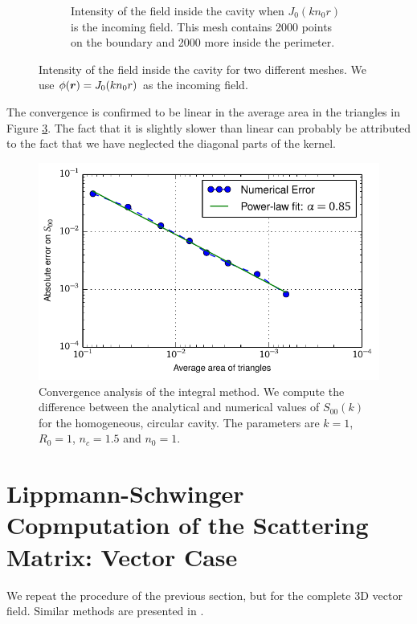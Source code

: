 \begin{figure}
\begin{subfigure}{0.47\textwidth}
		\caption[Intensity of the field inside the cavity, finer mesh]
				{Intensity of the field inside the cavity when
				$J_0(kn_0r)$ is the incoming field. This mesh contains
				2000 points on the boundary and 2000 more inside the perimeter.}
		\label{fig:app.numMethods.field.2000}
	\end{subfigure}
	\caption[Intensity of the field inside the cavity for two different meshes]
			{Intensity of the field inside the cavity for two different meshes.
			We use $\phi(\boldsymbol{r})=J_0(kn_0r)$ as the incoming field.}
	\label{fig:app.numMethods.fields}
\end{figure}

The convergence is confirmed to be linear in the average area in 
the triangles in Figure \ref{fig:app.numMethods.convergenceIntegralMethod}.
The fact that it is slightly slower than linear can probably be 
attributed to the fact that we have neglected the diagonal 
parts of the kernel. 

\begin{figure}
	\centering
	\includegraphics{figs/backmatter/convergenceAnalysis.pdf}
	\caption[Convergence analysis of the integral method]
			{Convergence analysis of the integral method. 
			We compute the difference between the analytical
			and numerical values of $S_{00}(k)$ for the homogeneous,
			circular cavity. The parameters are $k=1$, $R_0=1$, $n_c=1.5$
			and $n_0=1$.}
	\label{fig:app.numMethods.convergenceIntegralMethod}
\end{figure}

\section{Lippmann-Schwinger Copmputation of the Scattering Matrix: Vector Case}
We repeat the procedure of the previous section, but for the complete 3D vector
field. Similar methods are presented in \cite{deL2013,FAL2013}. 